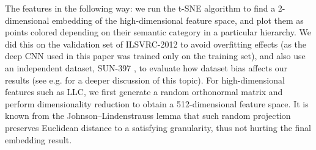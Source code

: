 The features in the following way: we run the t-SNE algorithm \cite{tsne} to find a 2-dimensional embedding of the high-dimensional feature space, and plot them as points colored depending on their semantic category in a particular hierarchy. We did this on the validation set of ILSVRC-2012 to avoid overfitting effects (as the deep CNN used in this paper was trained only on the training set), and also use an independent dataset, SUN-397 \cite{xiao10}, to evaluate how dataset bias affects our results (see e.g. \cite{torralba_cvpr11} for a deeper discussion of this topic). For high-dimensional features such as LLC, we first generate a random orthonormal matrix and perform dimensionality reduction to obtain a 512-dimensional feature space. It is known from the Johnson–Lindenstrauss lemma that such random projection preserves Euclidean distance to a satisfying granularity, thus not hurting the final embedding result.



